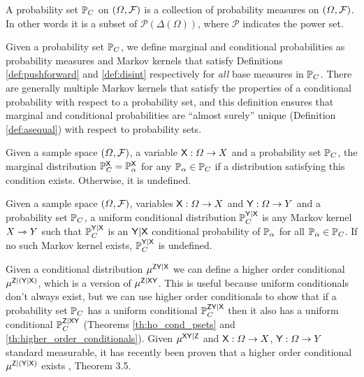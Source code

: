 \begin{definition}\label{def:prob_set}
A probability set $\mathbb{P}_C$ on $(\Omega,\mathcal{F})$ is a collection of probability measures on $(\Omega,\mathcal{F})$. In other words it is a subset of $\mathscr{P}(\Delta(\Omega))$, where $\mathscr{P}$ indicates the power set.
\end{definition}

Given a probability set $\mathbb{P}_C$, we define marginal and conditional probabilities as probability measures and Markov kernels that satisfy Definitions \ref{def:pushforward} and \ref{def:disint} respectively for \emph{all} base measures in $\mathbb{P}_C$. There are generally multiple Markov kernels that satisfy the properties of a conditional probability with respect to a probability set, and this definition ensures that marginal and conditional probabilities are ``almost surely'' unique (Definition \ref{def:asequal}) with respect to probability sets.

\begin{definition}
Given a sample space $(\Omega,\mathcal{F})$, a variable $\mathsf{X}:\Omega\to X$ and a probability set $\mathbb{P}_C$, the marginal distribution $\mathbb{P}_C^{\mathsf{X}}=\mathbb{P}_\alpha^{\mathsf{X}}$ for any $\mathbb{P}_\alpha\in\mathbb{P}_C$ if a distribution satisfying this condition exists. Otherwise, it is undefined.
\end{definition}

\begin{definition}\label{def:cprob_pset}
Given a sample space $(\Omega,\mathcal{F})$, variables $\mathsf{X}:\Omega\to X$ and $\mathsf{Y}:\Omega\to Y$ and a probability set $\mathbb{P}_C$, a uniform conditional distribution $\mathbb{P}_C^{\mathsf{Y}|\mathsf{X}}$ is any Markov kernel $X\rightarrowtriangle Y$ such that $\mathbb{P}_C^{\mathsf{Y}|\mathsf{X}}$ is an $\mathsf{Y}|\mathsf{X}$ conditional probability of $\mathbb{P}_\alpha$ for all $\mathbb{P}_\alpha\in \mathbb{P}_C$. If no such Markov kernel exists, $\mathbb{P}_C^{\mathsf{Y}|\mathsf{X}}$ is undefined.
\end{definition}

Given a conditional distribution $\mu^{\mathsf{ZY}|\mathsf{X}}$ we can define a higher order conditional $\mu^{\mathsf{Z}|(\mathsf{Y}|\mathsf{X})}$, which is a version of $\mu^{\mathsf{Z}|\mathsf{XY}}$. This is useful because uniform conditionals don't always exist, but we can use higher order conditionals to show that if a probability set $\mathbb{P}_C$ has a uniform conditional $\mathbb{P}_C^{\mathsf{ZY}|\mathsf{X}}$ then it also has a uniform conditional $\mathbb{P}_C^{\mathsf{Z}|\mathsf{XY}}$ (Theorems \ref{th:ho_cond_psets} and \ref{th:higher_order_conditionals}). Given $\mu^{\mathsf{XY}|\mathsf{Z}}$ and $\mathsf{X}:\Omega\to X$, $\mathsf{Y}:\Omega\to Y$ standard measurable, it has recently been proven that a higher order conditional $\mu^{\mathsf{Z}|(\mathsf{Y}|\mathsf{X})}$ exists \citet{bogachev_kantorovich_2020}, Theorem 3.5.

